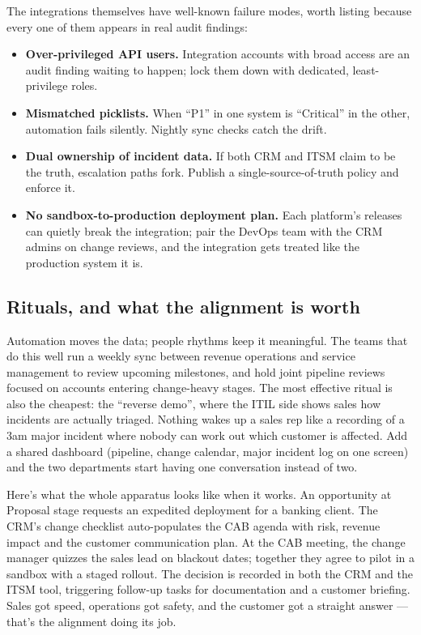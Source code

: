 The integrations themselves have well-known failure modes, worth listing because every one of them appears in real audit findings:


\begin{itemize}[leftmargin=*]
\item \textbf{Over-privileged API users.} Integration accounts with broad access are an audit finding waiting to happen; lock them down with dedicated, least-privilege roles.
\item \textbf{Mismatched picklists.} When ``P1'' in one system is ``Critical'' in the other, automation fails silently. Nightly sync checks catch the drift.
\item \textbf{Dual ownership of incident data.} If both CRM and ITSM claim to be the truth, escalation paths fork. Publish a single-source-of-truth policy and enforce it.
\item \textbf{No sandbox-to-production deployment plan.} Each platform's releases can quietly break the integration; pair the DevOps team with the CRM admins on change reviews, and the integration gets treated like the production system it is.
\end{itemize}


\subsection{Rituals, and what the alignment is worth}


Automation moves the data; people rhythms keep it meaningful. The teams that do this well run a weekly sync between revenue operations and service management to review upcoming milestones, and hold joint pipeline reviews focused on accounts entering change-heavy stages. The most effective ritual is also the cheapest: the ``reverse demo'', where the ITIL side shows sales how incidents are actually triaged. Nothing wakes up a sales rep like a recording of a 3am major incident where nobody can work out which customer is affected. Add a shared dashboard (pipeline, change calendar, major incident log on one screen) and the two departments start having one conversation instead of two.


Here's what the whole apparatus looks like when it works. An opportunity at Proposal stage requests an expedited deployment for a banking client. The CRM's change checklist auto-populates the CAB agenda with risk, revenue impact and the customer communication plan. At the CAB meeting, the change manager quizzes the sales lead on blackout dates; together they agree to pilot in a sandbox with a staged rollout. The decision is recorded in both the CRM and the ITSM tool, triggering follow-up tasks for documentation and a customer briefing. Sales got speed, operations got safety, and the customer got a straight answer — that's the alignment doing its job.


